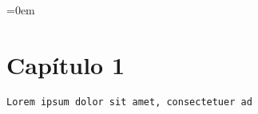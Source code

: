 \parindent=0em
\chapter{Capítulo 1}
\noindent
\texttt{Lorem ipsum dolor sit amet, consectetuer ad}\\

\lipsum[1-20]

















